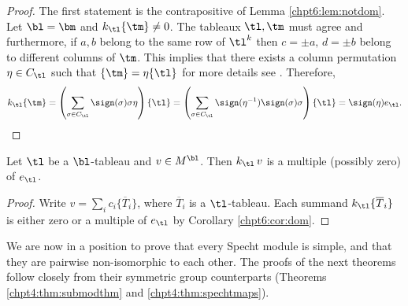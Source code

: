 \documentclass[11pt]{report}
\begin{document}
\begin{proof}
	The first statement is the contrapositive of Lemma \ref{chpt6:lem:notdom}.
	Let $\bl = \bm$ and $k_{\tl} \{\tm\} \neq 0$. The tableaux $\tl, \tm$ must agree and furthermore, if $a,b$ belong to the same row of $\tl^{k}$ then $c= \pm a, \,d =\pm b$ belong to different columns of $\tm$. This implies that 	
	there exists a column permutation $\eta \in C_{\tl}$ such that $\{\tm \}= \eta \{\tl\}$ for more details see \cite[Lemma 3.6]{can1996representations}. Therefore,
	\[k_{\tl} \{\tm\} = \left( \sum_{\sigma \in C_{\tl}} \sign(\sigma) \sigma \eta \right) \{\tl\}  = \left( \sum_{\sigma \in C_{\tl}} \sign(\eta^{-1}) \sign(\sigma)\sigma \right) \{\tl\}  = \sign(\eta) e_{\tl} . \qedhere \]
\end{proof}























\begin{corollary}
	\label{chpt6:cor:agreeconstant}
	Let $\tl$ be a $\bl$-tableau and $v \in 
	M^{\bl}$. Then $k_{\tl} \,v$ is a multiple (possibly zero) of $e_{\tl}$.
\end{corollary}
\begin{proof}
	Write $v = \sum_{i} c_{i} \{\overline{T}_{i} \}$, where $\overline{T}_{i}$ is a $\tl$-tableau. Each summand $k_{\tl} \{\overline{T}_{i}\}$ is either zero or a multiple of $e_{\tl}$ by Corollary \ref{chpt6:cor:dom}.
\end{proof}

We are now in a position to prove that every Specht module is simple, and that they are pairwise non-isomorphic to each other. 	The proofs of the next theorems follow closely from their symmetric group counterparts (Theorems \ref{chpt4:thm:submodthm} and \ref{chpt4:thm:spechtmaps}). 
\end{document}
